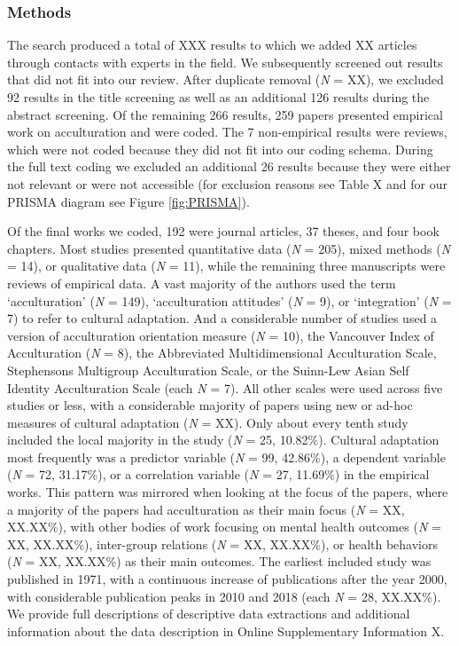 \documentclass[man, 12pt, a4paper]{apa7}
\begin{document}
\subsubsection{Methods}
The search produced a total of XXX results to which we added XX articles through contacts with experts in the field. We subsequently screened out results that did not fit into our review. After duplicate removal (\textit{N} = XX), we excluded 92 results in the title screening as well as an additional 126 results during the abstract screening. Of the remaining 266 results, 259 papers presented empirical work on acculturation and were coded. The 7 non-empirical results were reviews, which were not coded because they did not fit into our coding schema. During the full text coding we excluded an additional 26 results because they were either not relevant or were not accessible (for exclusion reasons see Table X and for our PRISMA diagram see Figure \ref{fig:PRISMA}). 

Of the final works we coded, 192 were journal articles, 37 theses, and four book chapters. Most studies presented quantitative data (\textit{N} = 205), mixed methods (\textit{N} = 14), or qualitative data (\textit{N} = 11), while the remaining three manuscripts were reviews of empirical data. A vast majority of the authors used the term `acculturation' (\textit{N} = 149), `acculturation attitudes' (\textit{N} = 9), or `integration' (\textit{N} = 7) to refer to cultural adaptation. And a considerable number of studies used a version of \citet{Berry1989} acculturation orientation measure (\textit{N} = 10), the Vancouver Index of Acculturation (\textit{N} = 8), the Abbreviated Multidimensional Acculturation Scale, Stephensons Multigroup Acculturation Scale, or the Suinn-Lew Asian Self Identity Acculturation Scale (each \textit{N} = 7). All other scales were used across five studies or less, with a considerable majority of papers using new or ad-hoc measures of cultural adaptation (\textit{N} = XX). Only about every tenth study included the local majority in the study (\textit{N} = 25, 10.82\%). Cultural adaptation most frequently was a predictor variable (\textit{N} = 99, 42.86\%), a dependent variable (\textit{N} = 72, 31.17\%), or a correlation variable (\textit{N} = 27, 11.69\%) in the empirical works. This pattern was mirrored when looking at the focus of the papers, where a majority of the papers had acculturation as their main focus (\textit{N} = XX, XX.XX\%), with other bodies of work focusing on mental health outcomes (\textit{N} = XX, XX.XX\%), inter-group relations (\textit{N} = XX, XX.XX\%), or health behaviors (\textit{N} = XX, XX.XX\%) as their main outcomes. The earliest included study was published in 1971, with a continuous increase of publications after the year 2000, with considerable publication peaks in 2010 and 2018 (each \textit{N} = 28, XX.XX\%). We provide full descriptions of descriptive data extractions and additional information about the data description in Online Supplementary Information X.
\end{document}
